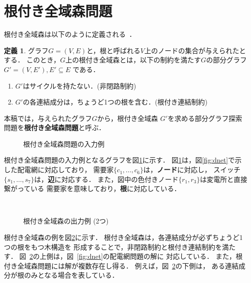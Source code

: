 ﻿\section{根付き全域森問題}\label{chap:problem}

\theoremstyle{definition}
\newtheorem*{definition*}{定義}

根付き全域森は以下のように定義される~\cite{Minato:dnet:netuki}．
\begin{definition*}
  グラフ$G=(V,E)$と，根と呼ばれる$V$上のノードの集合が与えられたとする．
  このとき，$G$上の根付き全域森とは，以下の制約を満たす$G$の部分グラフ
  $G'=(V,E'), E' \subseteq E$ である．
  \begin{enumerate}
  \item $G'$はサイクルを持たない．(非閉路制約)
  \item $G'$の各連結成分は，ちょうど1つの根を含む．(根付き連結制約)
  \end{enumerate}
本稿では，与えられたグラフ$G$から，根付き全域森
$G'$を求める部分グラフ探索問題を\textbf{根付き全域森問題}と呼ぶ．
\end{definition*}

\begin{figure}[tbp]
 \centering
 \scalebox{0.8}{}
 \caption{根付き全域森問題の入力例}
 \label{fig:dnetgraph}
\end{figure}

根付き全域森問題の入力例となるグラフを図\ref{fig:dnetgraph}に示す．
図\ref{fig:dnetgraph}は，図\ref{fig:dnet}で示した配電網に対応しており，
需要家$\{c_1,\ldots,c_6\}$は，\textbf{ノード}に対応し，
スイッチ$\{s_1,\ldots,s_7\}$は，\textbf{辺}に対応する．
また，図中の色付きノード$\{r_1,r_3\}$は変電所と直接繋がっている
需要家を意味しており，\textbf{根}に対応している．

\begin{figure}[tbp]
  \centering
  \scalebox{0.8}{}\\[1em]
  \scalebox{0.8}{}
  \caption{根付き全域森の出力例 (2つ)}
  \label{fig:netuki}
\end{figure}

根付き全域森の例を図\ref{fig:netuki}に示す．
根付き全域森は，各連結成分が必ずちょうど1つの根をもつ木構造を
形成することで，非閉路制約と根付き連結制約を満たす．
図~\ref{fig:netuki}の上側は，図~\ref{fig:dnet}の配電網問題の解に
対応している．
また，根付き全域森問題には解が複数存在し得る．
例えば，図~\ref{fig:netuki}の下側は，
ある連結成分が根のみとなる場合を表している．

